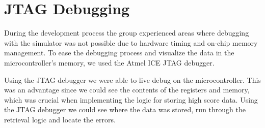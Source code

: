 \section{JTAG Debugging}
	During the development process the group experienced areas where debugging with the simulator was not possible due to hardware timing and on-chip memory management. To ease the debugging process and visualize the data in the microcontroller's memory, we used the Atmel ICE JTAG debugger. 
	
	Using the JTAG debugger we were able to live debug on the microcontroller. This was an advantage since we could see the contents of the registers and memory, which was crucial when implementing the logic for storing high score data. Using the JTAG debugger we could see where the data was stored, run through the retrieval logic and locate the errors. 
	